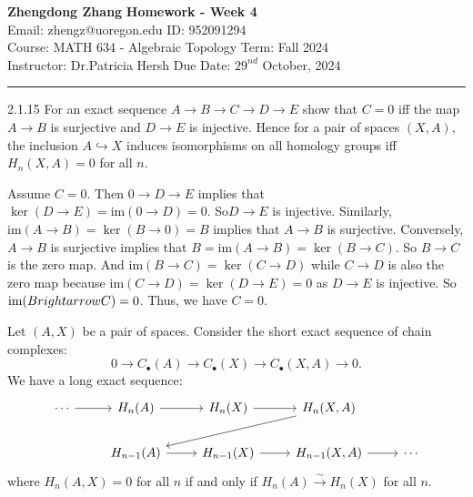 \documentclass[a4paper, 11pt]{article}
\begin{document}
\noindent
\large\textbf{Zhengdong Zhang} \hfill \textbf{Homework - Week 4}   \\
Email: zhengz@uoregon.edu \hfill ID: 952091294 \\
\normalsize Course: MATH 634 - Algebraic Topology  \hfill Term: Fall 2024\\
Instructor: Dr.Patricia Hersh \hfill Due Date: $29^{nd}$ October, 2024 \\
\noindent\rule{7in}{2.8pt}
\begin{problem}{2.1.15}
For an exact sequence \(A\rightarrow B\rightarrow C\rightarrow D\rightarrow E\) show that \(C=0\) iff the map \(A\rightarrow B\) is surjective and 
\(D\rightarrow E\) is injective. Hence for a pair of spaces \((X,A)\), the inclusion \(A\hookrightarrow X\) induces isomorphisms on all homology groups iff 
\(H_n(X,A)=0\) for all \(n\).
\end{problem}   
\begin{solution}
Assume \(C=0\). Then \(0\rightarrow D\rightarrow E\) implies that \(\ker (D\rightarrow E)=\text{im}(0\rightarrow D)=0\). So\(D\rightarrow E\) is injective. Similarly, 
\(\text{im}(A\rightarrow B)=\ker (B\rightarrow 0)=B\) implies  that \(A\rightarrow B\) is surjective. Conversely, \(A\rightarrow B\) is surjective implies that \(B=\text{im}(A\rightarrow B)=\ker (B\rightarrow C)\). 
So \(B\rightarrow C\) is the zero map. And \(\text{im}(B\rightarrow C)=\ker (C\rightarrow D)\) while \(C\rightarrow D\) is also the zero map because \(\text{im}(C\rightarrow D)=\ker (D\rightarrow E)=0\) as \(D\rightarrow E\) 
is injective. So \(\text{im}(B\\rightarrow C)=0\). Thus, we have \(C=0\). 
\par 
Let \((A,X)\) be a pair of spaces. Consider the short exact sequence of chain complexes:
$$0\rightarrow C_\bullet(A)\rightarrow C_\bullet(X)\rightarrow C_\bullet(X,A)\rightarrow 0.$$
We have a long exact sequence:
$$\begin{tikzcd}
	\cdots & {H_n(A)} & {H_n(X)} & {H_n(X,A)} \\
	& {H_{n-1}(A)} & {H_{n-1}(X)} & {H_{n-1}(X,A)} & \cdots
	\arrow[from=1-1, to=1-2]
	\arrow[from=1-2, to=1-3]
	\arrow[from=1-3, to=1-4]
	\arrow[from=1-4, to=2-2]
	\arrow[from=2-2, to=2-3]
	\arrow[from=2-3, to=2-4]
	\arrow[from=2-4, to=2-5]
\end{tikzcd}$$
where \(H_n(A,X)=0\) for all \(n\) if and only if \(H_n(A)\xrightarrow{\sim} H_n(X)\) for all \(n\).
\end{solution}
\end{document}
